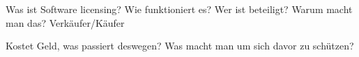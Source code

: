 Was ist Software licensing?
Wie funktioniert es?
Wer ist beteiligt?
Warum macht man das? Verkäufer/Käufer

Kostet Geld, was passiert deswegen?
Was macht man um sich davor zu schützen?

